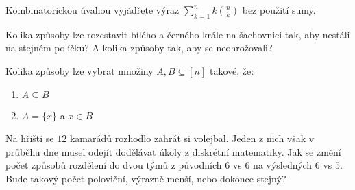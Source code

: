 \documentclass[10pt]{article}
\begin{document}
\begin{problem}
Kombinatorickou úvahou vyjádřete výraz $\sum_{k=1}^{n}k\binom{n}{k}$ bez použití sumy.
\end{problem}

\begin{problem}
Kolika způsoby lze rozestavit bílého a černého krále na šachovnici tak, aby nestáli na stejném políčku? A kolika způsoby tak, aby se neohrožovali?
\end{problem}

\begin{problem}
Kolika způsoby lze vybrat množiny $A,B \subseteq [n]$ takové, že:
\begin{enumerate}[label=\alph*)]
    \item $A \subseteq B$
    \item $A = \{x\}$ a $x \in B$
\end{enumerate}
\end{problem}

\begin{problem}
Na hřišti se $12$ kamarádů rozhodlo zahrát si volejbal. Jeden z nich však v průběhu dne musel odejít dodělávat úkoly z diskrétní matematiky. Jak se změní počet způsobů rozdělení do dvou týmů z původních $6$ vs $6$ na výsledných $6$ vs $5$. Bude takový počet poloviční, výrazně menší, nebo dokonce stejný?
\end{problem}
\end{document}

